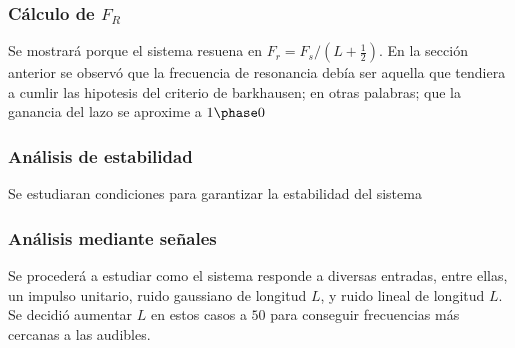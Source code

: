 \documentclass[assd_tp2_main.tex]{subfiles}
\begin{document}
\subsubsection{Cálculo de $F_R$}
Se mostrará porque el sistema resuena en $F_r=F_s/(L+\frac{1}{2})$. En la sección anterior se observó que la frecuencia de resonancia debía ser aquella que tendiera a cumlir las hipotesis del criterio de barkhausen; en otras palabras; que la ganancia del lazo se aproxime a $1\phase 0$

\subsubsection{Análisis de estabilidad}

Se estudiaran condiciones para garantizar la estabilidad del sistema

\subsubsection{Análisis mediante señales}
 
Se procederá a estudiar como el sistema responde a diversas entradas, entre ellas, un impulso unitario, ruido gaussiano de longitud $L$, y ruido lineal de longitud $L$. Se decidió aumentar $L$ en estos casos a $50$ para conseguir frecuencias más cercanas a las audibles.
 
\end{document}
